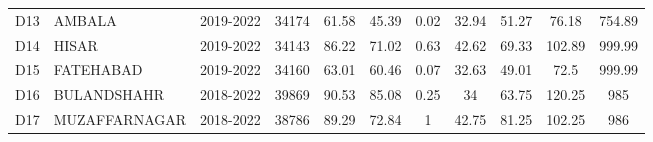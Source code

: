 \documentclass[a4paper, fleqn]{cas-sc}
\theoremstyle{definition}
\theoremstyle{remark}
\begin{document}
\begin{table}[h!]
\begin{tabular}{llccccccccc}
 D13 &  AMBALA         & 2019-2022 & 34174 & 61.58 & 45.39 & 0.02 & 32.94   & 51.27       & 76.18 & 754.89 \\
 D14 &  HISAR          & 2019-2022 & 34143 & 86.22 & 71.02 & 0.63 & 42.62   & 69.33       & 102.89 & 999.99 \\ 
 D15 &  FATEHABAD      & 2019-2022 & 34160 & 63.01 & 60.46 & 0.07 & 32.63   & 49.01       & 72.5    & 999.99 \\
 D16 &  BULANDSHAHR  & 2018-2022 & 39869  & 90.53 & 85.08 & 0.25 & 34      & 63.75       & 120.25  & 985    \\ 
 D17 &  MUZAFFARNAGAR  & 2018-2022 & 38786 & 89.29 & 72.84  & 1    & 42.75   & 81.25       & 102.25  & 986    \\ \hline
  \end{tabular}
  \end{table}
  
\end{document}
